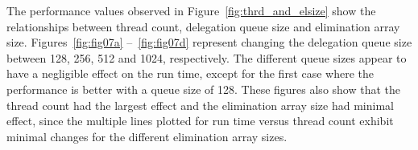 \clearpage
The performance values observed in Figure~\ref{fig:thrd_and_elsize} show the relationships between thread count, delegation queue size and elimination array size. Figures~\ref{fig:fig07a} --~\ref{fig:fig07d} represent changing the delegation queue size between 128,  256, 512 and 1024, respectively. The different queue sizes appear to have a negligible effect on the run time, except for the first case where the performance is better with a queue size of 128. These figures also show that the thread count had the largest effect and the elimination array size had minimal effect, since the multiple lines plotted for run time versus thread count exhibit minimal changes for the different elimination array sizes.

\begin{figure}[!t]
\centering
{}
\\

\end{figure}
